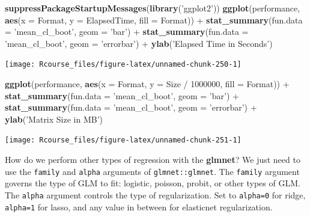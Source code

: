 \documentclass[]{book}
\newenvironment{Shaded}{\begin{snugshade}}{\end{snugshade}}
\newcommand{\KeywordTok}[1]{\textcolor[rgb]{0.13,0.29,0.53}{\textbf{{#1}}}}
\newcommand{\DataTypeTok}[1]{\textcolor[rgb]{0.13,0.29,0.53}{{#1}}}
\newcommand{\DecValTok}[1]{\textcolor[rgb]{0.00,0.00,0.81}{{#1}}}
\newcommand{\StringTok}[1]{\textcolor[rgb]{0.31,0.60,0.02}{{#1}}}
\newcommand{\NormalTok}[1]{{#1}}
\theoremstyle{definition}
\theoremstyle{definition}
\theoremstyle{remark}
\begin{document}
\begin{Shaded}
\begin{Highlighting}[]
\KeywordTok{suppressPackageStartupMessages}\NormalTok{(}\KeywordTok{library}\NormalTok{(}\StringTok{'ggplot2'}\NormalTok{))}
\KeywordTok{ggplot}\NormalTok{(performance, }\KeywordTok{aes}\NormalTok{(}\DataTypeTok{x =} \NormalTok{Format, }\DataTypeTok{y =} \NormalTok{ElapsedTime, }\DataTypeTok{fill =} \NormalTok{Format)) +}
\StringTok{  }\KeywordTok{stat_summary}\NormalTok{(}\DataTypeTok{fun.data =} \StringTok{'mean_cl_boot'}\NormalTok{, }\DataTypeTok{geom =} \StringTok{'bar'}\NormalTok{) +}
\StringTok{  }\KeywordTok{stat_summary}\NormalTok{(}\DataTypeTok{fun.data =} \StringTok{'mean_cl_boot'}\NormalTok{, }\DataTypeTok{geom =} \StringTok{'errorbar'}\NormalTok{) +}
\StringTok{  }\KeywordTok{ylab}\NormalTok{(}\StringTok{'Elapsed Time in Seconds'}\NormalTok{) }
\end{Highlighting}
\end{Shaded}

\texttt{[image: Rcourse\_files/figure-latex/unnamed-chunk-250-1]}

\begin{Shaded}
\begin{Highlighting}[]
\KeywordTok{ggplot}\NormalTok{(performance, }\KeywordTok{aes}\NormalTok{(}\DataTypeTok{x =} \NormalTok{Format, }\DataTypeTok{y =} \NormalTok{Size /}\StringTok{ }\DecValTok{1000000}\NormalTok{, }\DataTypeTok{fill =} \NormalTok{Format)) +}
\StringTok{  }\KeywordTok{stat_summary}\NormalTok{(}\DataTypeTok{fun.data =} \StringTok{'mean_cl_boot'}\NormalTok{, }\DataTypeTok{geom =} \StringTok{'bar'}\NormalTok{) +}
\StringTok{  }\KeywordTok{stat_summary}\NormalTok{(}\DataTypeTok{fun.data =} \StringTok{'mean_cl_boot'}\NormalTok{, }\DataTypeTok{geom =} \StringTok{'errorbar'}\NormalTok{) +}
\StringTok{  }\KeywordTok{ylab}\NormalTok{(}\StringTok{'Matrix Size in MB'}\NormalTok{) }
\end{Highlighting}
\end{Shaded}

\texttt{[image: Rcourse\_files/figure-latex/unnamed-chunk-251-1]}

How do we perform other types of regression with the \textbf{glmnet}? We
just need to use the \texttt{family} and \texttt{alpha} arguments of
\texttt{glmnet::glmnet}. The \texttt{family} argument governs the type
of GLM to fit: logistic, poisson, probit, or other types of GLM. The
\texttt{alpha} argument controls the type of regularization. Set to
\texttt{alpha=0} for ridge, \texttt{alpha=1} for lasso, and any value in
between for elasticnet regularization.
\end{document}
